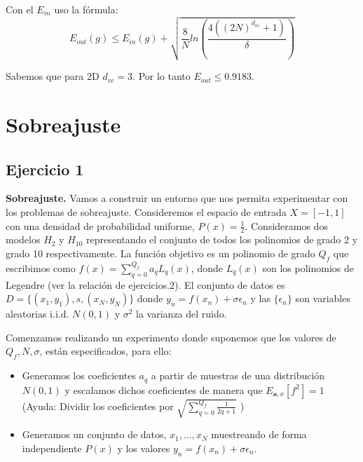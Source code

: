 \begin{enumerate}
		Con el $E_{in}$ uso la fórmula:
		$$E_{out}(g) \leq E_{in}(g) + \sqrt{\frac{8}{N}ln(\frac{4((2N)^{d_{vc}}+1)}{\delta})}$$
		
		Sabemos que para 2D $d_{vc}=3$. Por lo tanto $E_{out} \leq 0.9183$.
	\end{enumerate}
	
	
	\section{Sobreajuste}
	\subsection{Ejercicio 1}
	\textbf{Sobreajuste.} Vamos a construir un entorno que nos permita experimentar con los problemas de sobreajuste. Consideremos el espacio de entrada $X=[-1,1]$ con una densidad de probabilidad uniforme, $P(x)=\frac{1}{2}$. Consideramos dos modelos $H_2$ y $H_{10}$ representando el conjunto de todos los polinomios de grado 2 y grado 10 respectivamente. La función objetivo es un polinomio de grado $Q_f$ que escribimos como $f(x)=\sum_{q=0}^{Q_f} a_q L_q(x)$, donde $L_q(x)$ son los polinomios de Legendre (ver la relación de ejercicios.2). El conjunto de datos es $D=\{ (x_1,y_1),s,(x_N,y_N)\}$ donde $y_n=f(x_n)+\sigma\epsilon_n$ y las $\{\epsilon_n\}$ son variables aleatorias i.i.d.  ${{N}}(0,1)$ y $\sigma^2$ la varianza del ruido.
	
	Comenzamos realizando un experimento donde suponemos que los valores  de $Q_f,N, \sigma$, están especificados, para ello:
	\begin{itemize}
		\item Generamos  los coeficientes $a_q$ a partir de muestras de una distribución ${{N}}(0,1)$ y escalamos dichos coeficientes de manera que $E_{\mathbf{a},x}[f^2]=1$ (Ayuda: Dividir los coeficientes por $\sqrt{\sum_{q=0}^{Q_f} \frac{1}{2q+1}}$ )
		\item Generamos un conjunto de datos,  $x_1,\dots,x_N$ muestreando de forma independiente  $P(x)$ y los valores $y_n=f(x_n)+\sigma\epsilon_n$.
	\end{itemize}
	\\
	\\
	
